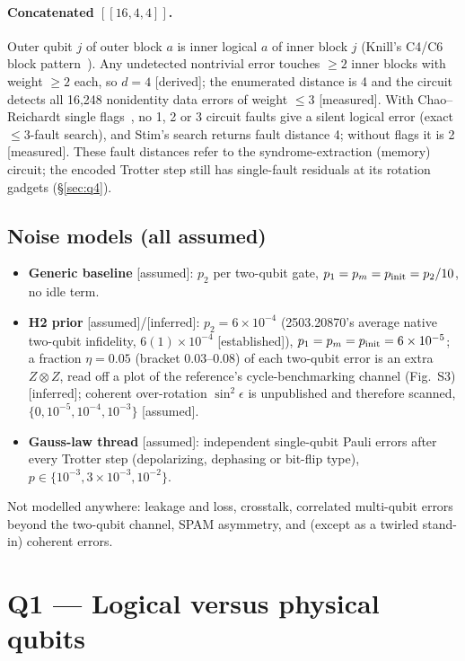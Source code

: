 \documentclass[11pt,a4paper]{article}
\newcommand{\tg}[1]{\textsf{\small[#1]}}
\newcommand{\est}{\tg{established}}
\newcommand{\der}{\tg{derived}}
\newcommand{\mea}{\tg{measured}}
\newcommand{\infr}{\tg{inferred}}
\newcommand{\asm}{\tg{assumed}}
\begin{document}
\paragraph{Concatenated $[[16,4,4]]$.} Outer qubit $j$ of outer block $a$ is inner logical $a$ of inner block
$j$ (Knill's C4/C6 block pattern~\cite{knill}). Any undetected nontrivial error touches $\ge2$ inner blocks with
weight $\ge2$ each, so $d=4$ \der; the enumerated distance is 4 and the circuit detects all 16{,}248 nonidentity
data errors of weight $\le3$ \mea. With Chao--Reichardt single flags~\cite{chao}, no 1, 2 or 3 circuit faults
give a silent logical error (exact $\le3$-fault search), and Stim's search returns fault distance 4; without
flags it is 2 \mea. These fault distances refer to the syndrome-extraction (memory) circuit; the encoded Trotter
step still has single-fault residuals at its rotation gadgets (\S\ref{sec:q4}).

\subsection{Noise models (all assumed)}
\begin{itemize}
\item \textbf{Generic baseline} \asm: $p_2$ per two-qubit gate, $p_1=p_m=p_{\rm init}=p_2/10$, no idle term.
\item \textbf{H2 prior} \asm{}/\infr: $p_2=6\times10^{-4}$ (2503.20870's average native two-qubit infidelity,
  $6(1)\times10^{-4}$ \est), $p_1=p_m=p_{\rm init}=6\times10^{-5}$; a fraction $\eta=0.05$ (bracket 0.03--0.08)
  of each two-qubit error is an extra $Z\otimes Z$, read off a plot of the reference's cycle-benchmarking
  channel (Fig.~S3) \infr; coherent over-rotation $\sin^2\epsilon$ is unpublished and therefore scanned,
  $\{0,10^{-5},10^{-4},10^{-3}\}$ \asm.
\item \textbf{Gauss-law thread} \asm: independent single-qubit Pauli errors after every Trotter step
  (depolarizing, dephasing or bit-flip type), $p\in\{10^{-3},3\times10^{-3},10^{-2}\}$.
\end{itemize}
Not modelled anywhere: leakage and loss, crosstalk, correlated multi-qubit errors beyond the two-qubit channel,
SPAM asymmetry, and (except as a twirled stand-in) coherent errors.

\section{Q1 --- Logical versus physical qubits}\label{sec:q1}
\end{document}
